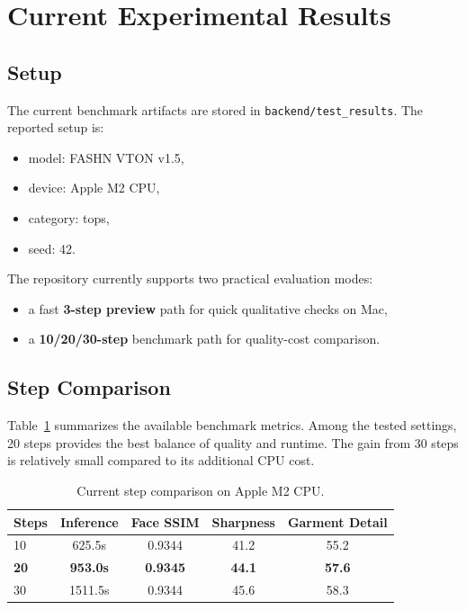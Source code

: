\documentclass[a4paper,10pt,twocolumn]{article}
\begin{document}
\section{Current Experimental Results}
\label{sec:results}

\subsection{Setup}

The current benchmark artifacts are stored in \texttt{backend/test\_results}. The reported setup is:
\begin{itemize}[leftmargin=*, itemsep=2pt]
  \item model: FASHN VTON v1.5,
  \item device: Apple M2 CPU,
  \item category: tops,
  \item seed: 42.
\end{itemize}

The repository currently supports two practical evaluation modes:
\begin{itemize}[leftmargin=*, itemsep=2pt]
  \item a fast \textbf{3-step preview} path for quick qualitative checks on Mac,
  \item a \textbf{10/20/30-step} benchmark path for quality-cost comparison.
\end{itemize}

\subsection{Step Comparison}

Table~\ref{tab:step_comparison} summarizes the available benchmark metrics. Among the tested settings, 20 steps provides the best balance of quality and runtime. The gain from 30 steps is relatively small compared to its additional CPU cost.

\begin{table}[t]
\centering
\caption{Current step comparison on Apple M2 CPU.}
\label{tab:step_comparison}
\small
\begin{tabular}{lcccc}
\toprule
\textbf{Steps} & \textbf{Inference} & \textbf{Face SSIM} & \textbf{Sharpness} & \textbf{Garment Detail} \\
\midrule
10 & 625.5s & 0.9344 & 41.2 & 55.2 \\
\textbf{20} & \textbf{953.0s} & \textbf{0.9345} & \textbf{44.1} & \textbf{57.6} \\
30 & 1511.5s & 0.9344 & 45.6 & 58.3 \\
\bottomrule
\end{tabular}
\end{table}
\end{document}
